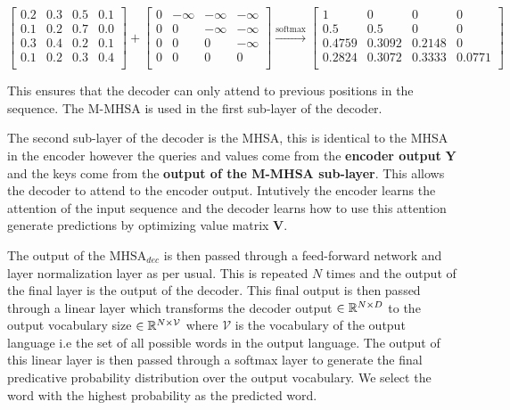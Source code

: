 \documentclass[../main.tex]{subfiles}
\begin{document}
\begin{equation}
	\begin{bmatrix}
		0.2 & 0.3 & 0.5 & 0.1 \\
		0.1 & 0.2 & 0.7 & 0.0 \\
		0.3 & 0.4 & 0.2 & 0.1 \\
		0.1 & 0.2 & 0.3 & 0.4 \\
	\end{bmatrix} + 
	\begin{bmatrix}
		0 & -\infty & -\infty & -\infty \\
		0 & 0 & -\infty & -\infty \\
		0 & 0 & 0 & -\infty \\
		0 & 0 & 0 & 0 \\
	\end{bmatrix}
	\xrightarrow{\text{softmax}}
	\begin{bmatrix}
		1 & 0 & 0 & 0 \\
		0.5 & 0.5 & 0 & 0 \\
		0.4759 & 0.3092 & 0.2148 & 0 \\
		0.2824 & 0.3072 & 0.3333 & 0.0771 \\
	\end{bmatrix}
\end{equation}



This ensures that the decoder can only attend to previous positions in the sequence. The M-MHSA is used in the first sub-layer of the decoder. 

The second sub-layer of the decoder is the MHSA, this is identical to the MHSA in the encoder however the queries and values come from the \textbf{encoder output} $\bm{Y}$ and the keys come from the \textbf{output of the M-MHSA sub-layer}. This allows the decoder to attend to the encoder output. Intutively the encoder learns the attention of the input sequence and the decoder learns how to use this attention generate predictions by optimizing value matrix $\bm{V}$.


The output of the $\text{MHSA}_{dec}$ is then passed through a feed-forward network and layer normalization layer as per usual. This is repeated $N$ times and the output of the final layer is the output of the decoder. This final output is then passed through a linear layer which transforms the decoder output $\in \mathbb{R}^{N \times D}$ to the output vocabulary size $\in \mathbb{R}^{N \times \mathcal{V}}$ where $\mathcal{V}$ is the vocabulary of the output language i.e the set of all possible words in the output language. The output of this linear layer is then passed through a softmax layer to generate the final predicative probability distribution over the output vocabulary. We select the word with the highest probability as the predicted word.
\end{document}
